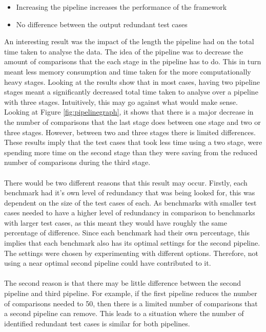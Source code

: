 \begin{itemize}
\item Increasing the pipeline increases the performance of the framework
\item No difference between the output redundant test cases
\end{itemize}

An interesting result was the impact of the length the pipeline had on the total time taken to analyse the data. The idea of the pipeline was to decrease the amount of comparisons that the each stage in the pipeline has to do. This in turn meant less memory consumption and time taken for the more computationally heavy stages. Looking at the results show that in most cases, having two pipeline stages meant a significantly decreased total time taken to analyse over a pipeline with three stages. Intuitively, this may go against what would make sense. Looking at Figure \ref{fig:pipelinegraph}, it shows that there is a major decrease in the number of comparisons that the last stage does between one stage and two or three stages. However, between two and three stages there is limited differences. These results imply that the test cases that took less time using a two stage, were spending more time on the second stage than they were saving from the reduced number of comparisons during the third stage. 
\paragraph{}
There would be two different reasons that this result may occur. Firstly, each benchmark had it's own level of redundancy that was being looked for, this was dependent on the size of the test cases of each. As benchmarks with smaller test cases needed to have a higher level of redundancy in comparison to benchmarks with larger test cases, as this meant they would have roughly the same percentage of difference. Since each benchmark had their own percentage, this implies that each benchmark also has its optimal settings for the second pipeline. The settings were chosen by experimenting with different options. Therefore, not using a near optimal second pipeline could have contributed to it. 
\paragraph{}
The second reason is that there may be little difference between the second pipeline and third pipeline. For example, if the first pipeline reduces the number of comparisons needed to 50, then there is a limited number of comparisons that a second pipeline can remove. This leads to a situation where the number of identified redundant test cases is similar for both pipelines.
